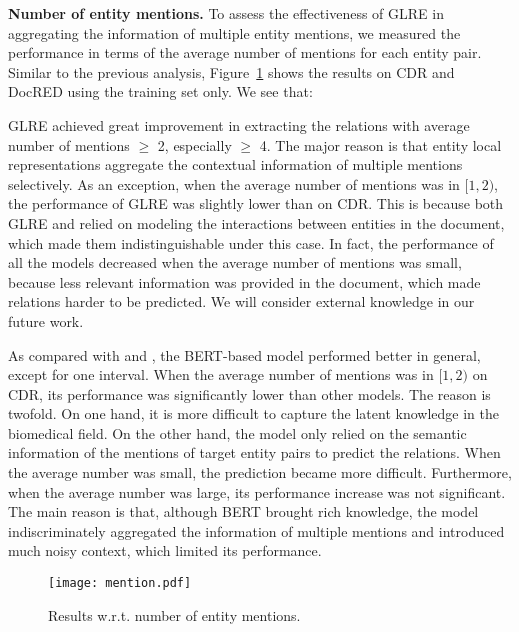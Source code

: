 \documentclass[11pt,a4paper]{article}
\begin{document}
\smallskip
\noindent\textbf{Number of entity mentions.} To assess the effectiveness of GLRE in aggregating the information of multiple entity mentions, we measured the performance in terms of the average number of mentions for each entity pair. Similar to the previous analysis, Figure~\ref{fig:mention} shows the results on CDR and DocRED using the training set only. We see that:
\begin{compactenum}[(1)]
\item GLRE achieved great improvement in extracting the relations with average number of mentions $\geq$ 2, especially $\geq$ 4. The major reason is that  entity local representations aggregate the contextual information of multiple mentions selectively. As an exception, when the average number of mentions was in $[1,2)$, the performance of GLRE was slightly lower than \citet{christopoulou2019connecting} on CDR. This is because both GLRE and \citet{christopoulou2019connecting} relied on modeling the interactions between entities in the document, which made them indistinguishable under this case. In fact, the performance of all the models decreased when the average number of mentions was small, because less relevant information was provided in the document, which made relations harder to be predicted. We will consider external knowledge in our future work.

\item As compared with \citet{zhang2018graph} and \citet{christopoulou2019connecting}, the BERT-based model \cite{wang2019fine} performed better in general, except for one interval. When the average number of mentions was in $[1,2)$ on CDR, its performance was significantly lower than other models. The reason is twofold. On one hand, it is more difficult to capture the latent knowledge in the biomedical field. On the other hand, the model \cite{wang2019fine} only relied on the semantic information of the mentions of target entity pairs to predict the relations. When the average number was small, the prediction became more difficult. Furthermore, when the average number was large, its performance increase was not significant. The main reason is that, although BERT brought rich knowledge, the model \cite{wang2019fine} indiscriminately aggregated the information of multiple mentions and introduced much noisy context, which limited its performance. 
\end{compactenum}

\begin{figure}
	\centering
	\texttt{[image: mention.pdf]}
	\caption{Results w.r.t. number of entity mentions.}
	\label{fig:mention}
\end{figure}
\end{document}
